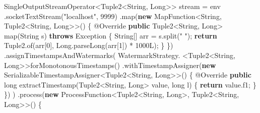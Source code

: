 \documentclass[cn,11pt,chinese]{elegantbook}
\newenvironment{Shaded}{}{}
\newcommand{\AttributeTok}[1]{\textcolor[rgb]{0.49,0.56,0.16}{#1}}
\newcommand{\BuiltInTok}[1]{#1}
\newcommand{\DataTypeTok}[1]{\textcolor[rgb]{0.56,0.13,0.00}{#1}}
\newcommand{\DecValTok}[1]{\textcolor[rgb]{0.25,0.63,0.44}{#1}}
\newcommand{\FunctionTok}[1]{\textcolor[rgb]{0.02,0.16,0.49}{#1}}
\newcommand{\KeywordTok}[1]{\textcolor[rgb]{0.00,0.44,0.13}{\textbf{#1}}}
\newcommand{\NormalTok}[1]{#1}
\newcommand{\StringTok}[1]{\textcolor[rgb]{0.25,0.44,0.63}{#1}}
\begin{document}
\begin{Shaded}
\begin{Highlighting}[]
\NormalTok{        SingleOutputStreamOperator\textless{}Tuple2\textless{}}\BuiltInTok{String}\NormalTok{, }\BuiltInTok{Long}\NormalTok{\textgreater{}\textgreater{} stream = env}
\NormalTok{            .}\FunctionTok{socketTextStream}\NormalTok{(}\StringTok{"localhost"}\NormalTok{, }\DecValTok{9999}\NormalTok{)}
\NormalTok{            .}\FunctionTok{map}\NormalTok{(}\KeywordTok{new}\NormalTok{ MapFunction\textless{}}\BuiltInTok{String}\NormalTok{, Tuple2\textless{}}\BuiltInTok{String}\NormalTok{, }\BuiltInTok{Long}\NormalTok{\textgreater{}\textgreater{}() \{}
                \AttributeTok{@Override}
                \KeywordTok{public}\NormalTok{ Tuple2\textless{}}\BuiltInTok{String}\NormalTok{, }\BuiltInTok{Long}\NormalTok{\textgreater{} }\FunctionTok{map}\NormalTok{(}\BuiltInTok{String}\NormalTok{ s) }\KeywordTok{throws} \BuiltInTok{Exception}\NormalTok{ \{}
                    \BuiltInTok{String}\NormalTok{[] arr = s.}\FunctionTok{split}\NormalTok{(}\StringTok{" "}\NormalTok{);}
                    \KeywordTok{return}\NormalTok{ Tuple2.}\FunctionTok{of}\NormalTok{(arr[}\DecValTok{0}\NormalTok{], }\BuiltInTok{Long}\NormalTok{.}\FunctionTok{parseLong}\NormalTok{(arr[}\DecValTok{1}\NormalTok{]) * }\DecValTok{1000L}\NormalTok{);}
\NormalTok{                \}}
\NormalTok{            \})}
\NormalTok{            .}\FunctionTok{assignTimestampsAndWatermarks}\NormalTok{(}
\NormalTok{                WatermarkStrategy.}
\NormalTok{                    \textless{}Tuple2\textless{}}\BuiltInTok{String}\NormalTok{, }\BuiltInTok{Long}\NormalTok{\textgreater{}\textgreater{}}\FunctionTok{forMonotonousTimestamps}\NormalTok{()}
\NormalTok{                    .}\FunctionTok{withTimestampAssigner}\NormalTok{(}\KeywordTok{new}\NormalTok{ SerializableTimestampAssigner\textless{}Tuple2\textless{}}\BuiltInTok{String}\NormalTok{, }\BuiltInTok{Long}\NormalTok{\textgreater{}\textgreater{}() \{}
                        \AttributeTok{@Override}
                        \KeywordTok{public} \DataTypeTok{long} \FunctionTok{extractTimestamp}\NormalTok{(Tuple2\textless{}}\BuiltInTok{String}\NormalTok{, }\BuiltInTok{Long}\NormalTok{\textgreater{} value, }\DataTypeTok{long}\NormalTok{ l) \{}
                            \KeywordTok{return}\NormalTok{ value.}\FunctionTok{f1}\NormalTok{;}
\NormalTok{                        \}}
\NormalTok{                    \})}
\NormalTok{            )}
\NormalTok{            .}\FunctionTok{process}\NormalTok{(}\KeywordTok{new}\NormalTok{ ProcessFunction\textless{}Tuple2\textless{}}\BuiltInTok{String}\NormalTok{, }\BuiltInTok{Long}\NormalTok{\textgreater{}, Tuple2\textless{}}\BuiltInTok{String}\NormalTok{, }\BuiltInTok{Long}\NormalTok{\textgreater{}\textgreater{}() \{}

\end{Highlighting}
\end{Shaded}
\end{document}
